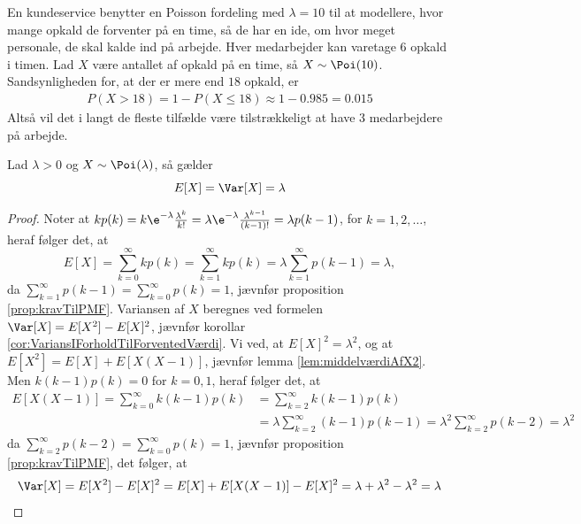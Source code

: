 \begin{exmp}\label{exmp:kundeservice}
En kundeservice benytter en Poisson fordeling med $\lambda = 10$ til at modellere, hvor mange opkald de forventer på en time, så de har en ide, om hvor meget personale, de skal kalde ind på arbejde. Hver medarbejder kan varetage $6$ opkald i timen. Lad $X$ være antallet af opkald på en time, så $X \sim \Poi(10)$.
Sandsynligheden for, at der er mere end $18$ opkald, er
\begin{align*}
    P(X > 18) = 1 - P(X \leq 18) \approx 1 - 0.985 = 0.015
\end{align*}
Altså vil det i langt de fleste tilfælde være tilstrækkeligt at have 3 medarbejdere på arbejde. 
\end{exmp}
\begin{prop}\label{prop:poiForventedOgVarians} %
Lad $\lambda > 0$ og $X \sim \Poi(\lambda)$, så gælder
\begin{equation*}
    E[X] = \Var[X] = \lambda
\end{equation*}
\end{prop}
\begin{proof}
Noter at $kp(k) = k \e^{-\lambda} \frac{\lambda^k}{k!} = \lambda \e^{-\lambda} \frac{\lambda^{k - 1}}{(k - 1)!} = \lambda p(k - 1)$, for $k = 1, 2, \ldots$, heraf følger det, at 
\begin{equation*}
    E[X] = \sum^\infty_{k = 0} k p(k) = \sum^\infty_{k = 1} k p(k) = \lambda \sum^\infty_{k = 1} p(k - 1) = \lambda,
\end{equation*}
da $\sum^\infty_{k = 1} p(k - 1) = \sum^\infty_{k = 0} p(k) =  1$, jævnfør proposition \ref{prop:kravTilPMF}.
Variansen af $X$ beregnes ved formelen $\Var[X] = E[X^2] - E[X]^2$, jævnfør korollar \ref{cor:VariansIForholdTilForventedVærdi}. Vi ved, at $E[X]^2 = \lambda^2$, og at $E[X^2] = E[X] + E[X(X - 1)]$, jævnfør lemma \ref{lem:middelværdiAfX2}. Men $k(k - 1)p(k) = 0$ for $k = 0, 1$, heraf følger det, at
\begin{align*}
    E[X(X-1)] = \sum^{\infty}_{k = 0} k (k - 1) p(k)
    &= \sum^\infty_{k = 2} k(k - 1) p(k) \\ &=  \lambda\sum^\infty_{k = 2} (k - 1) p(k - 1) =\lambda^2 \sum^\infty_{k = 2} p(k - 2) = \lambda^2
\end{align*}
da $\sum^\infty_{k = 2} p(k - 2) = \sum^\infty_{k = 0} p(k) = 1$, jævnfør proposition \ref{prop:kravTilPMF}, det følger, at 
\begin{equation*}
    \Var[X] = E[X^2] - E[X]^2 = E[X] + E[X(X - 1)] - E[X]^2 = \lambda + \lambda^2 - \lambda^2 = \lambda
\end{equation*}
\end{proof}
